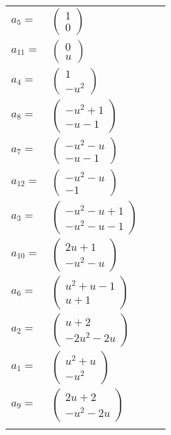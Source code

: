 \documentclass[1p]{elsarticle_modified}
\theoremstyle{definition}
\begin{document}
\begin{tabular}{m{7pt} m{180pt} m{7pt} m{180pt} }
\flushright $a_{5}=$&$\begin{pmatrix}1\\0\end{pmatrix}$ \\
\flushright $a_{11}=$&$\begin{pmatrix}0\\u\end{pmatrix}$ \\
\flushright $a_{4}=$&$\begin{pmatrix}1\\- u^2\end{pmatrix}$ \\
\flushright $a_{8}=$&$\begin{pmatrix}- u^2+1\\- u-1\end{pmatrix}$ \\
\flushright $a_{7}=$&$\begin{pmatrix}- u^2- u\\- u-1\end{pmatrix}$ \\
\flushright $a_{12}=$&$\begin{pmatrix}- u^2- u\\-1\end{pmatrix}$ \\
\flushright $a_{3}=$&$\begin{pmatrix}- u^2- u+1\\- u^2- u-1\end{pmatrix}$ \\
\flushright $a_{10}=$&$\begin{pmatrix}2 u+1\\- u^2- u\end{pmatrix}$ \\
\flushright $a_{6}=$&$\begin{pmatrix}u^2+u-1\\u+1\end{pmatrix}$ \\
\flushright $a_{2}=$&$\begin{pmatrix}u+2\\-2 u^2-2 u\end{pmatrix}$ \\
\flushright $a_{1}=$&$\begin{pmatrix}u^2+u\\- u^2\end{pmatrix}$ \\
\flushright $a_{9}=$&$\begin{pmatrix}2 u+2\\- u^2-2 u\end{pmatrix}$\\&\end{tabular}
\end{document}
